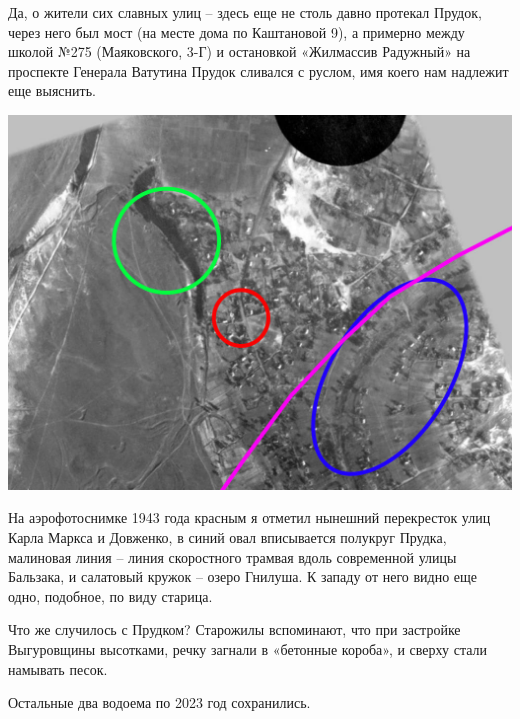 
Да, о жители сих славных улиц – здесь еще не столь давно протекал Прудок, через него был мост (на месте дома по Каштановой 9), а примерно между школой №275 (Маяковского, 3-Г) и остановкой «Жилмассив Радужный» на проспекте Генерала Ватутина Прудок сливался с руслом, имя коего нам надлежит еще выяснить.

\begin{center}
\includegraphics[width=\linewidth]{chast-gorodki/vyg-troya/troya-prudok.jpg}
\end{center}

На аэрофотоснимке 1943 года красным я отметил нынешний перекресток улиц Карла Маркса и Довженко, в синий овал вписывается полукруг Прудка, малиновая линия – линия скоростного трамвая вдоль современной улицы Бальзака, и салатовый кружок – озеро Гнилуша. К западу от него видно еще одно, подобное, по виду старица.

Что же случилось с Прудком? Старожилы вспоминают, что при застройке Выгуровщины высотками, речку загнали в «бетонные короба», и сверху стали намывать песок.

Остальные два водоема по 2023 год сохранились.
